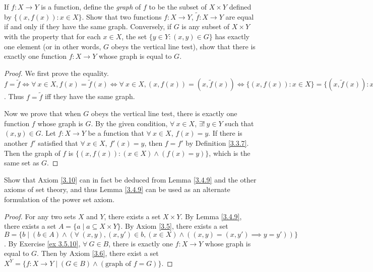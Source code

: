 \begin{exercise}\label{ex 3.5.10}
If \(f : X \to Y\) is a function, define the \emph{graph} of \(f\) to be the subset of \(X \times Y\) defined by \(\{(x, f(x)) : x \in X\}\).
Show that two functions \(f : X \to Y\), \(\tilde{f} : X \to Y\) are equal if and only if they have the same graph.
Conversely, if \(G\) is any subset of \(X \times Y\) with the property that for each \(x \in X\), the set \(\{y \in Y : (x, y) \in G\}\) has exactly one element (or in other words, \(G\) obeys the vertical line test), show that there is exactly one function \(f : X \to Y\) whose graph is equal to \(G\).
\end{exercise}

\begin{proof}
We first prove the equality.
\(f = \tilde{f} \iff \forall\ x \in X, f(x) = \tilde{f}(x) \iff \forall\ x \in X, (x, f(x)) = (x, \tilde{f}(x)) \iff \{(x, f(x)) : x \in X\} = \{(x, \tilde{f}(x)) : x \in X\}\).
Thus \(f = \tilde{f}\) iff they have the same graph.

Now we prove that when \(G\) obeys the vertical line test, there is exactly one function \(f\) whose graph is \(G\).
By the given condition, \(\forall\ x \in X\), \(\exists!\ y \in Y\) such that \((x, y) \in G\).
Let \(f : X \to Y\) be a function that \(\forall\ x \in X\), \(f(x) = y\).
If there is another \(f'\) satisfied that \(\forall\ x \in X\), \(f'(x) = y\), then \(f = f'\) by Definition \ref{3.3.7}.
Then the graph of \(f\) is \(\{(x, f(x)) : (x \in X) \land (f(x) = y)\}\), which is the same set as \(G\).
\end{proof}

\begin{exercise}\label{ex 3.5.11}
Show that Axiom \ref{3.10} can in fact be deduced from Lemma \ref{3.4.9} and the other axioms of set theory, and thus Lemma \ref{3.4.9} can be used as an alternate formulation of the power set axiom.
\end{exercise}

\begin{proof}
For any two sets \(X\) and \(Y\), there exists a set \(X \times Y\).
By Lemma \ref{3.4.9}, there exists a set \(A = \{a \mid a \subseteq X \times Y\}\).
By Axiom \ref{3.5}, there exists a set \(B = \{b \mid (b \in A) \land (\forall\ (x, y), (x, y') \in b, (x \in X) \land ((x, y) = (x, y') \implies y = y'))\}\).
By Exercise \ref{ex 3.5.10}, \(\forall\ G \in B\), there is exactly one \(f : X \to Y\) whose graph is equal to \(G\).
Then by Axiom \ref{3.6}, there exist a set \(X^Y = \{f : X \to Y \mid (G \in B) \land (\text{graph of } f = G)\}\).
\end{proof}

